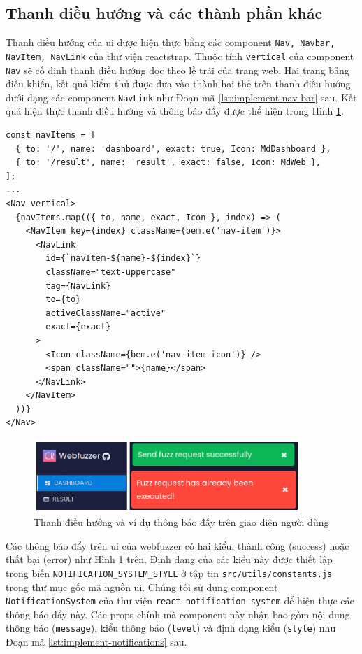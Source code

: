 \subsection{Thanh điều hướng và các thành phần khác}
Thanh điều hướng của \acrshort{ui} được hiện thực bằng các component \texttt{Nav, Navbar, NavItem, NavLink} của thư viện reactstrap. Thuộc tính \texttt{vertical} của component \texttt{Nav} sẽ cố định thanh điều hướng dọc theo lề trái của trang web. Hai trang bảng điều khiển, kết quả kiểm thử được đưa vào thành hai thẻ trên thanh điều hướng dưới dạng các component \texttt{NavLink} như Đoạn mã \ref{lst:implement-nav-bar} sau. Kết quả hiện thực thanh điều hướng và thông báo đẩy được thể hiện trong Hình \ref{fig:notification-example}.
\begin{lstlisting}[style=ES6, label={lst:implement-nav-bar}, caption={Các thuộc tính props truyền vào component Nav}]
const navItems = [
  { to: '/', name: 'dashboard', exact: true, Icon: MdDashboard },
  { to: '/result', name: 'result', exact: false, Icon: MdWeb },
];
...
<Nav vertical>
  {navItems.map(({ to, name, exact, Icon }, index) => (
    <NavItem key={index} className={bem.e('nav-item')}>
      <NavLink
        id={`navItem-${name}-${index}`}
        className="text-uppercase"
        tag={NavLink}
        to={to}
        activeClassName="active"
        exact={exact}
      >
        <Icon className={bem.e('nav-item-icon')} />
        <span className="">{name}</span>
      </NavLink>
    </NavItem>
  ))}
</Nav>
\end{lstlisting}
\begin{figure}[H]
  \centering
    \includegraphics[width=0.9\textwidth,keepaspectratio=true]{images/notification-example.png}
  \caption{Thanh điều hướng và ví dụ thông báo đấy trên giao diện người dùng}
  \label{fig:notification-example}
\end{figure}
Các thông báo đẩy trên \acrshort{ui} của webfuzzer có hai kiểu, thành công (success) hoặc thất bại (error) như Hình \ref{fig:notification-example} trên. Định dạng của các kiểu này được thiết lập trong biến \texttt{NOTIFICATION\_SYSTEM\_STYLE} ở tập tin \texttt{src/utils/constants.js} trong thư mục gốc mã nguồn \acrshort{ui}. Chúng tôi sử dụng component \texttt{NotificationSystem} của thư viện \texttt{react-notification-system} để hiện thực các thông báo đẩy này. Các props chính mà component này nhận bao gồm nội dung thông báo (\texttt{message}), kiểu thông báo (\texttt{level}) và định dạng kiểu (\texttt{style}) như Đoạn mã \ref{lst:implement-notifications} sau.
